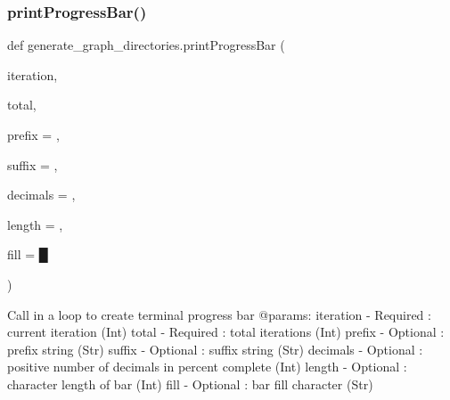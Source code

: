 \mbox{\label{namespacegenerate__graph__directories_a8743ea193c5226788a5fc44c0ed83027_a8743ea193c5226788a5fc44c0ed83027}} 
\subsubsection{\texorpdfstring{print\+Progress\+Bar()}{printProgressBar()}}
{\footnotesize\ttfamily def generate\+\_\+graph\+\_\+directories.\+print\+Progress\+Bar (\begin{DoxyParamCaption}\item[{}]{iteration,  }\item[{}]{total,  }\item[{}]{prefix = {\ttfamily \textquotesingle{}\textquotesingle{}},  }\item[{}]{suffix = {\ttfamily \textquotesingle{}\textquotesingle{}},  }\item[{}]{decimals = {},  }\item[{}]{length = {},  }\item[{}]{fill = {\ttfamily \textquotesingle{}█\textquotesingle{}} }\end{DoxyParamCaption})}

\begin{DoxyVerb}Call in a loop to create terminal progress bar
@params:
    iteration   - Required  : current iteration (Int)
    total       - Required  : total iterations (Int)
    prefix      - Optional  : prefix string (Str)
    suffix      - Optional  : suffix string (Str)
    decimals    - Optional  : positive number of decimals in percent complete (Int)
    length      - Optional  : character length of bar (Int)
    fill        - Optional  : bar fill character (Str)
\end{DoxyVerb}
 \mbox{\label{namespacegenerate__graph__directories_a4de5ee502ec92aaea6af6d143f913893_a4de5ee502ec92aaea6af6d143f913893}} 
